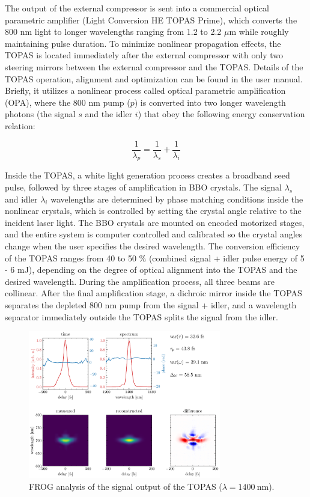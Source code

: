The output of the external compressor is sent into a commercial optical parametric amplifier (Light Conversion HE TOPAS Prime), which converts the 800 nm light to longer wavelengths ranging from 1.2 to 2.2 $\mu$m while roughly maintaining pulse duration. To minimize nonlinear propagation effects, the TOPAS is located immediately after the external compressor with only two steering mirrors between the external compressor and the TOPAS. Details of the TOPAS operation, alignment and optimization can be found in the user manual. Briefly, it utilizes a nonlinear process called optical parametric amplification (OPA), where the 800 nm pump ($p$) is converted into two longer wavelength photons (the signal $s$ and the idler $i$) that obey the following energy conservation relation:

\begin{equation}
\frac{1}{\lambda_p} = \frac{1}{\lambda_s} + \frac{1}{\lambda_i}
\end{equation}

Inside the TOPAS, a white light generation process creates a broadband seed pulse, followed by three stages of amplification in BBO crystals. The signal $\lambda_s$ and idler $\lambda_i$ wavelengths are determined by phase matching conditions inside the nonlinear crystals, which is controlled by setting the crystal angle relative to the incident laser light. The BBO crystals are mounted on encoded motorized stages, and the entire system is computer controlled and calibrated so the crystal angles change when the user specifies the desired wavelength. The conversion efficiency of the TOPAS ranges from 40 to 50 \% (combined signal + idler pulse energy of 5 - 6 mJ), depending on the degree of optical alignment into the TOPAS and the desired wavelength. During the amplification process, all three beams are collinear. After the final amplification stage, a dichroic mirror inside the TOPAS separates the depleted 800 nm pump from the signal + idler, and a wavelength separator immediately outside the TOPAS splits the signal from the idler.

\begin{figure}
	\centering
	\includegraphics[width=0.75\textwidth]{figures/chap2/TOPAS_FROG_1400nm.pdf}
	\caption{FROG analysis of the signal output of the TOPAS ($\lambda = 1400 \ \textrm{nm}$).}
	\label{fig:TOPAS_FROG_1400nm}
\end{figure}

